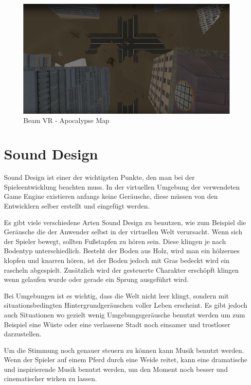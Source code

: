 \begin {figure}
    \centering
    \includegraphics[scale=0.3]{pics/beamvr_apocalypse-overview}
    \caption{Beam VR - Apocalypse Map}
    \label{fig:beamvr_apocalypse_map}
\end {figure}



\section{Sound Design}\label{sec:sound}
Sound Design ist einer der wichtigsten Punkte, den man bei der Spieleentwicklung beachten muss.
In der virtuellen Umgebung der verwendeten Game Engine existieren anfangs keine Geräusche, diese m\"ussen von den Entwicklern selber erstellt und eingef\"ugt werden.


Es gibt viele verschiedene Arten Sound Design zu benutzen, wie zum Beispiel die Ger\"ausche die der Anwender selbst in der virtuellen Welt verursacht.
Wenn sich der Spieler bewegt, sollten Fußstapfen zu h\"oren sein.
Diese klingen je nach Bodentyp unterschiedlich.
Besteht der Boden aus Holz, wird man ein h\"olzernes klopfen und knarren h\"oren, ist der Boden jedoch mit Gras bedeckt wird ein rascheln abgespielt.
Zus\"atzlich wird der gesteuerte Charakter ersch\"opft klingen wenn gelaufen wurde oder gerade ein Sprung ausgef\"uhrt wird.

Bei Umgebungen ist es wichtig, dass die Welt nicht leer klingt, sondern mit situationsbedingten Hintergrundger\"auschen voller Leben erscheint.
Es gibt jedoch auch Situationen wo gezielt wenig Umgebungsger\"ausche benutzt werden um zum Beispiel eine W\"uste oder eine verlassene Stadt noch einsamer und trostloser darzustellen.

Um die Stimmung noch genauer steuern zu k\"onnen kann Musik benutzt werden.
Wenn der Spieler auf einem Pferd durch eine Weide reitet, kann eine dramatische und inspirierende Musik benutzt werden, um den Moment noch besser und cinematischer wirken zu lassen.
~\cite{GK_Media_Factory_Sound_Design_2022}

